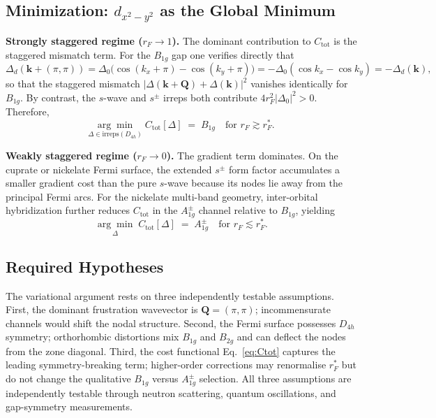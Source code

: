   \subsection{Minimization: $d_{x^2-y^2}$ as the Global Minimum}
    \label{subsec:minimization-as-the-global-minimum}

    \textbf{Strongly staggered regime ($r_F \to 1$).}
    The dominant contribution to $C_\textrm{tot}$ is the staggered mismatch term.
    For the $B_{1g}$ gap one verifies directly that
    \begin{equation}
      \Delta_d(\mathbf{k}+(\pi,\pi))
      = \Delta_0\bigl(\cos(k_x+\pi) - \cos(k_y+\pi)\bigr)
      = -\Delta_0(\cos k_x - \cos k_y) = -\Delta_d(\mathbf{k}),
      \label{eq:dwave_stagger}
    \end{equation}
    so that the staggered mismatch $|\Delta(\mathbf{k}+\mathbf{Q}) + \Delta(\mathbf{k})|^2$
    vanishes identically for $B_{1g}$.
    By contrast, the $s$-wave and $s^\pm$ irreps both contribute
    $4r_F^2|\Delta_0|^2 > 0$.
    Therefore,
    \begin{equation}
      \underset{\Delta \in \mathrm{irreps}(D_{4h})}{\arg\min}\; C_\textrm{tot}[\Delta]
      \;=\; B_{1g} \quad \text{for } r_F \gtrsim r_F^*.
      \label{eq:dwave_min}
    \end{equation}

    \textbf{Weakly staggered regime ($r_F \to 0$).}
    The gradient term dominates.
    On the cuprate or nickelate Fermi surface, the extended $s^\pm$ form factor accumulates a
    smaller gradient cost than the pure $s$-wave because its nodes lie away from the principal
    Fermi arcs.
    For the nickelate multi-band geometry, inter-orbital hybridization further reduces
    $C_\textrm{tot}$ in the $A_{1g}^\pm$ channel relative to $B_{1g}$, yielding
    \begin{equation}
      \underset{\Delta}{\arg\min}\; C_\textrm{tot}[\Delta] \;=\; A_{1g}^\pm \quad
      \text{for } r_F \lesssim r_F^*.
      \label{eq:spm_min}
    \end{equation}

  \subsection{Required Hypotheses}
    \label{subsec:required-hypotheses}

    The variational argument rests on three independently testable assumptions.
    First, the dominant frustration wavevector is $\mathbf{Q} = (\pi,\pi)$; incommensurate
    channels would shift the nodal structure.
    Second, the Fermi surface possesses $D_{4h}$ symmetry; orthorhombic distortions mix
    $B_{1g}$ and $B_{2g}$ and can deflect the nodes from the zone diagonal.
    Third, the cost functional Eq.~\eqref{eq:Ctot} captures the leading symmetry-breaking term;
    higher-order corrections may renormalise $r_F^*$ but do not change the qualitative
    $B_{1g}$ versus $A_{1g}^\pm$ selection.
    All three assumptions are independently testable through neutron scattering, quantum
    oscillations, and gap-symmetry measurements.
